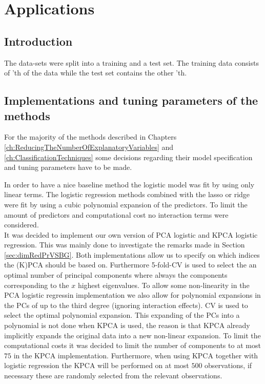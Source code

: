 \chapter{Applications}
\label{ch:Applications}
\section{Introduction}

The data-sets were split into a training and a test set. The training data consists of 'th of the data while the test set contains the other 'th.\\

\section{Implementations and tuning parameters of the methods}
\label{sec:implementation}
For the majority of the methods described in Chapters \ref{ch:ReducingTheNumberOfExplanatoryVariables} and \ref{ch:ClassificationTechniques} some decisions regarding their model specification and tuning parameters have to be made.

In order to have a nice baseline method the logistic model was fit by using only linear terms. The logistic regression methods combined with the lasso or ridge were fit by using a cubic polynomial expansion of the predictors. To limit the amount of predictors and computational cost no interaction terms were considered. \\

It was decided to implement our own version of PCA logistic and KPCA logistic regression. This was mainly done to investigate the remarks made in Section \ref{sec:dimRedPrVSBG}. Both implementations allow us to specify on which indices the (K)PCA should be based on. Furthermore 5-fold-CV is used to select the an optimal number of principal components where always the components corresponding to the $x$ highest eigenvalues. To allow some non-linearity in the PCA logistic regressin implementation we also allow for polynomial expansions in the PCs of up to the third degree (ignoring interaction effects). CV is used to select the optimal polynomial expansion. This expanding of the PCs into a polynomial is not done when KPCA is used, the reason is that KPCA already implicitly expands the original data into a new non-linear expansion. To limit the computational costs it was decided to limit the number of components to at most $75$ in the KPCA implementation. Furthermore, when using KPCA together with logistic regression the KPCA will be performed on at most $500$ observations, if necessary these are randomly selected from the relevant observations. \\

